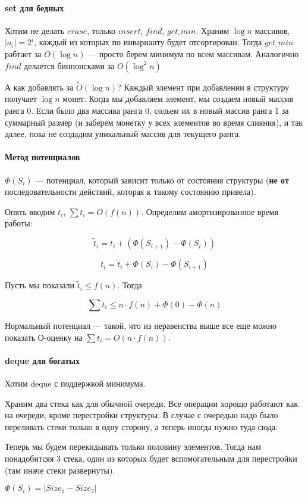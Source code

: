\documentclass[12pt]{article}
\begin{document}
\paragraph{set для бедных}

Хотим не делать $erase$, только $insert$, $find$, $get\_min$. Храним $\log n$ массивов, $|a_i| = 2^i$, каждый из которых по инварианту будет отсортирован. Тогда $get\_min$ рабтает за $O(\log n)$ --- просто берем минимум по всем массивам. Аналогично $find$ делается бинпоисками за $O(\log^2 n)$ 

А как добавлять за $\tilde O(\log n)$? Каждый элемент при добавлении в структуру получает $\log n$ монет. Когда мы добавляем элемент, мы создаем новый массив ранга 0. Если было два массива  ранга 0, сольем их в новый массив ранга 1 за суммарный размер (и заберем монетку у всех элементов во время слияния), и так далее, пока не создадим уникальный массив для текущего ранга.

\paragraph{Метод потенциалов}

$\Phi(S_i)$ --- потенциал, который зависит только от состояния структуры (\textbf{не от} последовательности действий, которая к такому состоянию привела).

Опять вводим $t_i$, $\sum t_i = O(f(n))$. Определим амортизированное время работы:

$$\tilde t_i = t_i + (\Phi(S_{i+1}) - \Phi(S_i))$$

$$t_i = \tilde t_i + \Phi(S_i) - \Phi(S_{i+1})$$

Пусть мы показали $\tilde t_i \le f(n)$. Тогда

$$\sum t_i \le n \cdot f(n) + \Phi(0) - \Phi(n)$$

Нормальный потенциал --- такой, что из неравенства выше все еще можно показать О-оценку на $\sum t_i = O(n \cdot f(n))$.

\paragraph{deque для богатых}

Хотим deque с поддержкой минимума.

Храним два стека как для обычной очереди. Все операции хорошо работают как на очереди, кроме перестройки структуры. В случае с очередью надо было переливать стеки только в одну сторону, а теперь иногда нужно туда-сюда.

Теперь мы будем перекидывать только половину элементов. Тогда нам понадобитсяя 3 стека, один из которых будет вспомогательным для перестройки (там иначе стеки развернуты).

$\Phi(S_i) = |Size_1 - Size_2|$
\end{document}
